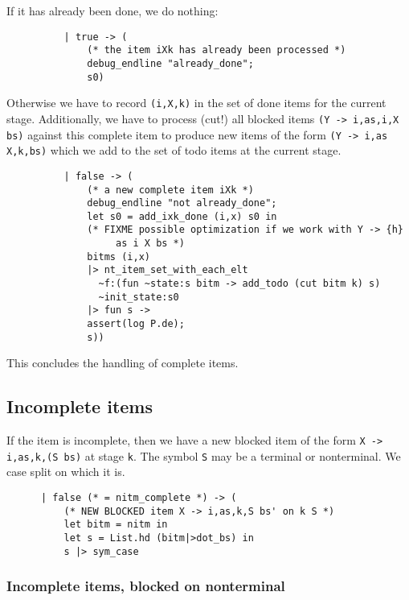 \documentclass[]{article}
\begin{document}
\begin{multicols}{2}
If it has already been done, we do nothing:

\begin{verbatim}
          | true -> (
              (* the item iXk has already been processed *)
              debug_endline "already_done"; 
              s0)
\end{verbatim}

Otherwise we have to record \texttt{(i,X,k)} in the set of done items
for the current stage. Additionally, we have to process (cut!) all
blocked items \texttt{(Y -\textgreater{} i\textquotesingle{},as,i,X bs)}
against this complete item to produce new items of the form
\texttt{(Y -\textgreater{} i\textquotesingle{},as X,k,bs)} which we add
to the set of todo items at the current stage.

\begin{verbatim}
          | false -> (
              (* a new complete item iXk *)
              debug_endline "not already_done";
              let s0 = add_ixk_done (i,x) s0 in
              (* FIXME possible optimization if we work with Y -> {h}
                   as i X bs *)
              bitms (i,x)
              |> nt_item_set_with_each_elt
                ~f:(fun ~state:s bitm -> add_todo (cut bitm k) s)
                ~init_state:s0
              |> fun s ->
              assert(log P.de);
              s))  
\end{verbatim}

This concludes the handling of complete items.

\subsection{Incomplete items}

If the item is incomplete, then we have a new blocked item of the form
\texttt{X -\textgreater{} i,as,k,(S bs\textquotesingle{})} at stage
\texttt{k}. The symbol \texttt{S} may be a terminal or nonterminal. We
case split on which it is.

\begin{verbatim}
      | false (* = nitm_complete *) -> (
          (* NEW BLOCKED item X -> i,as,k,S bs' on k S *)
          let bitm = nitm in
          let s = List.hd (bitm|>dot_bs) in
          s |> sym_case
\end{verbatim}

\subsubsection{Incomplete items, blocked on nonterminal}


\end{multicols}
\end{document}
